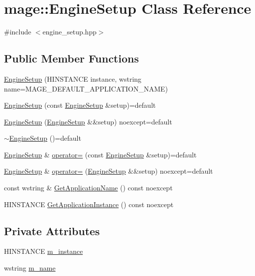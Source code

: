 \hypertarget{classmage_1_1_engine_setup}{}\section{mage\+:\+:Engine\+Setup Class Reference}
\label{classmage_1_1_engine_setup}


{\ttfamily \#include $<$engine\+\_\+setup.\+hpp$>$}

\subsection*{Public Member Functions}
\begin{DoxyCompactItemize}
\item 
\hyperlink{classmage_1_1_engine_setup_af7f073a09fb2b997e5ab7fc615eb2317}{Engine\+Setup} (H\+I\+N\+S\+T\+A\+N\+CE instance, wstring name=M\+A\+G\+E\+\_\+\+D\+E\+F\+A\+U\+L\+T\+\_\+\+A\+P\+P\+L\+I\+C\+A\+T\+I\+O\+N\+\_\+\+N\+A\+ME)
\item 
\hyperlink{classmage_1_1_engine_setup_a40980f5fce1554c2a93707efdf4486a9}{Engine\+Setup} (const \hyperlink{classmage_1_1_engine_setup}{Engine\+Setup} \&setup)=default
\item 
\hyperlink{classmage_1_1_engine_setup_a22b87954ad7a2bc26ff7f26fb443c58c}{Engine\+Setup} (\hyperlink{classmage_1_1_engine_setup}{Engine\+Setup} \&\&setup) noexcept=default
\item 
\hyperlink{classmage_1_1_engine_setup_a0480bee101756b72233a1aa7d44eb185}{$\sim$\+Engine\+Setup} ()=default
\item 
\hyperlink{classmage_1_1_engine_setup}{Engine\+Setup} \& \hyperlink{classmage_1_1_engine_setup_a4234ca6df84db6a2005b994ed42da11f}{operator=} (const \hyperlink{classmage_1_1_engine_setup}{Engine\+Setup} \&setup)=default
\item 
\hyperlink{classmage_1_1_engine_setup}{Engine\+Setup} \& \hyperlink{classmage_1_1_engine_setup_a4c2e71f96f138b28fd6ff1c088d05a53}{operator=} (\hyperlink{classmage_1_1_engine_setup}{Engine\+Setup} \&\&setup) noexcept=default
\item 
const wstring \& \hyperlink{classmage_1_1_engine_setup_ab79015dba68069256ed42595b30a5728}{Get\+Application\+Name} () const noexcept
\item 
H\+I\+N\+S\+T\+A\+N\+CE \hyperlink{classmage_1_1_engine_setup_ac29f9c2b68f8afada8009190616bf36b}{Get\+Application\+Instance} () const noexcept
\end{DoxyCompactItemize}
\subsection*{Private Attributes}
\begin{DoxyCompactItemize}
\item 
H\+I\+N\+S\+T\+A\+N\+CE \hyperlink{classmage_1_1_engine_setup_a13e9577c9762cccf127b51c1188d9477}{m\+\_\+instance}
\item 
wstring \hyperlink{classmage_1_1_engine_setup_a3866920e44c0752a89265f9f0c5c5d05}{m\+\_\+name}
\end{DoxyCompactItemize}


